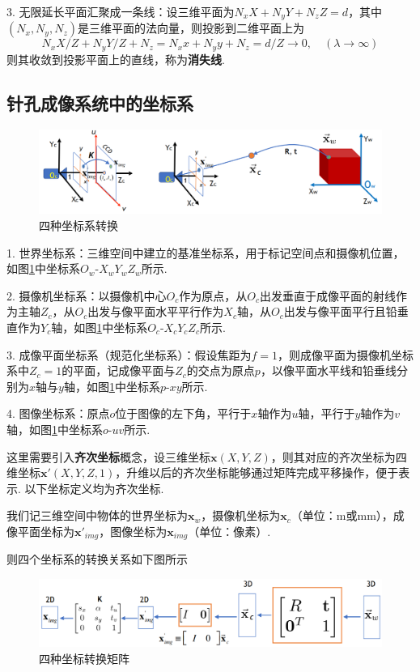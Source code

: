 \documentclass[12pt, a4paper, oneside]{ctexart}
\numberwithin{equation}{section}  %
\def\bd{\boldsymbol}        %
\begin{document}
3. 无限延长平面汇聚成一条线：设三维平面为$N_xX+N_yY+N_zZ=  d$，其中$(N_x,N_y,N_z)$是三维平面的法向量，则投影到二维平面上为
\begin{equation*}
    N_xX/Z+N_yY/Z+N_z=N_xx+N_yy+N_z=d/Z\to 0,\quad (\lambda\to\infty)   
\end{equation*}
则其收敛到投影平面上的直线，称为\textbf{消失线}.
\subsection{针孔成像系统中的坐标系}
\begin{figure}[htbp]
    \centering
    \includegraphics[scale=0.55]{坐标系转换.png}
    \caption{\label{fig-1}四种坐标系转换}
\end{figure}
1. 世界坐标系：三维空间中建立的基准坐标系，用于标记空间点和摄像机位置，如图\ref{fig-1}中坐标系$O_w\text{-}X_wY_wZ_w$所示.

2. 摄像机坐标系：以摄像机中心$O_c$作为原点，从$O_c$出发垂直于成像平面的射线作为主轴$Z_c$，从$O_c$出发与像平面水平平行作为$X_c$轴，从$O_c$出发与像平面平行且铅垂直作为$Y_c$轴，如图\ref{fig-1}中坐标系$O_c\text{-}X_cY_cZ_c$所示.

3. 成像平面坐标系（规范化坐标系）：假设焦距为$f=1$，则成像平面为摄像机坐标系中$Z_c=1$的平面，记成像平面与$Z_c$的交点为原点$p$，以像平面水平线和铅垂线分别为$x$轴与$y$轴，如图\ref{fig-1}中坐标系$p\text{-}xy$所示.

4. 图像坐标系：原点$o$位于图像的左下角，平行于$x$轴作为$u$轴，平行于$y$轴作为$v$轴，如图\ref{fig-1}中坐标系$o\text{-}uv$所示.

这里需要引入\textbf{齐次坐标}概念，设三维坐标$\bd{x}(X,Y,Z)$，则其对应的齐次坐标为四维坐标$\bd{x'}(X,Y,Z,1)$，升维以后的齐次坐标能够通过矩阵完成平移操作，便于表示. 以下坐标定义均为齐次坐标.

我们记三维空间中物体的世界坐标为$\bd{x}_w$，摄像机坐标为$\bd{x}_c$（单位：m或mm），成像平面坐标为$\bd{x}'_{img}$，图像坐标为$\bd{x}_{img}$（单位：像素）.

则四个坐标系的转换关系如下图所示
\begin{figure}[htbp]
    \centering
    \includegraphics[scale=0.55]{转换坐标.png}
    \caption{\label{fig-2}四种坐标转换矩阵}
\end{figure}
\end{document}
